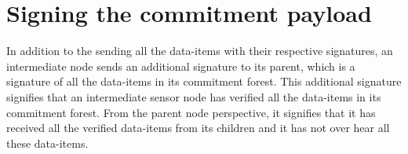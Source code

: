 	\section{Signing the commitment payload}
		In addition to the sending all the data-items with their respective signatures, an intermediate node sends an additional signature to its parent, which is a signature of all the data-items in its commitment forest.
		This additional signature signifies that an intermediate sensor node has verified all the data-items in its commitment forest.
		From the parent node perspective, it signifies that it has received all the verified data-items from its children and it has not over hear all these data-items.
		
